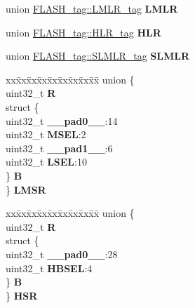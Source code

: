 \begin{DoxyCompactItemize}
\begin{tabbing}
\end{tabbing}\item 
\mbox{\label{structFLASH__tag_a3b85c26f37cd0b6c3a3c49938ab7b2fc}} 
union \mbox{\hyperlink{unionFLASH__tag_1_1LMLR__tag}{F\+L\+A\+S\+H\+\_\+tag\+::\+L\+M\+L\+R\+\_\+tag}} {\bfseries L\+M\+LR}
\item 
\mbox{\label{structFLASH__tag_a5d29af3e9e175f5387af42319aeff54c}} 
union \mbox{\hyperlink{unionFLASH__tag_1_1HLR__tag}{F\+L\+A\+S\+H\+\_\+tag\+::\+H\+L\+R\+\_\+tag}} {\bfseries H\+LR}
\item 
\mbox{\label{structFLASH__tag_a678ecff524b281118e8af038f33c553c}} 
union \mbox{\hyperlink{unionFLASH__tag_1_1SLMLR__tag}{F\+L\+A\+S\+H\+\_\+tag\+::\+S\+L\+M\+L\+R\+\_\+tag}} {\bfseries S\+L\+M\+LR}
\item 
\mbox{\label{structFLASH__tag_a6b28becdac782f687cd30bb956791edd}} 
\begin{tabbing}
xx\=xx\=xx\=xx\=xx\=xx\=xx\=xx\=xx\=\kill
union \{\\
\>uint32\_t {\bfseries R}\\
\>struct \{\\
\>\>uint32\_t {\bfseries \_\_pad0\_\_}:14\\
\>\>uint32\_t {\bfseries MSEL}:2\\
\>\>uint32\_t {\bfseries \_\_pad1\_\_}:6\\
\>\>uint32\_t {\bfseries LSEL}:10\\
\>\} {\bfseries B}\\
\} {\bfseries LMSR}\\

\end{tabbing}\item 
\mbox{\label{structFLASH__tag_aef5e6651f93888e8f3fdbb08371df598}} 
\begin{tabbing}
xx\=xx\=xx\=xx\=xx\=xx\=xx\=xx\=xx\=\kill
union \{\\
\>uint32\_t {\bfseries R}\\
\>struct \{\\
\>\>uint32\_t {\bfseries \_\_pad0\_\_}:28\\
\>\>uint32\_t {\bfseries HBSEL}:4\\
\>\} {\bfseries B}\\
\} {\bfseries HSR}\\


\end{tabbing}
\end{DoxyCompactItemize}
